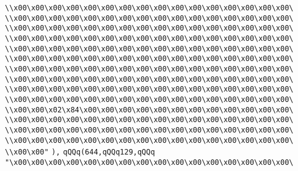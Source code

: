 \verb|\\x00\x00\x00\x00\x00\x00\x00\x00\x00\x00\x00\x00\x00\x00\x00\x00\|\newline
\verb|\\x00\x00\x00\x00\x00\x00\x00\x00\x00\x00\x00\x00\x00\x00\x00\x00\|\newline
\verb|\\x00\x00\x00\x00\x00\x00\x00\x00\x00\x00\x00\x00\x00\x00\x00\x00\|\newline
\verb|\\x00\x00\x00\x00\x00\x00\x00\x00\x00\x00\x00\x00\x00\x00\x00\x00\|\newline
\verb|\\x00\x00\x00\x00\x00\x00\x00\x00\x00\x00\x00\x00\x00\x00\x00\x00\|\newline
\verb|\\x00\x00\x00\x00\x00\x00\x00\x00\x00\x00\x00\x00\x00\x00\x00\x00\|\newline
\verb|\\x00\x00\x00\x00\x00\x00\x00\x00\x00\x00\x00\x00\x00\x00\x00\x00\|\newline
\verb|\\x00\x00\x00\x00\x00\x00\x00\x00\x00\x00\x00\x00\x00\x00\x00\x00\|\newline
\verb|\\x00\x00\x00\x00\x00\x00\x00\x00\x00\x00\x00\x00\x00\x00\x00\x00\|\newline
\verb|\\x00\x00\x00\x00\x00\x00\x00\x00\x00\x00\x00\x00\x00\x00\x00\x00\|\newline
\verb|\\x00\x00\x02\x84\x00\x00\x00\x00\x00\x00\x00\x00\x00\x00\x00\x00\|\newline
\verb|\\x00\x00\x00\x00\x00\x00\x00\x00\x00\x00\x00\x00\x00\x00\x00\x00\|\newline
\verb|\\x00\x00\x00\x00\x00\x00\x00\x00\x00\x00\x00\x00\x00\x00\x00\x00\|\newline
\verb|\\x00\x00\x00\x00\x00\x00\x00\x00\x00\x00\x00\x00\x00\x00\x00\x00\|\newline
\verb|\\x00\x00"|\newline
\verb|),|\newline
\verb|qQQq(644,qQQq129,qQQq|\newline
\verb|"\x00\x00\x00\x00\x00\x00\x00\x00\x00\x00\x00\x00\x00\x00\x00\x00\|\newline
